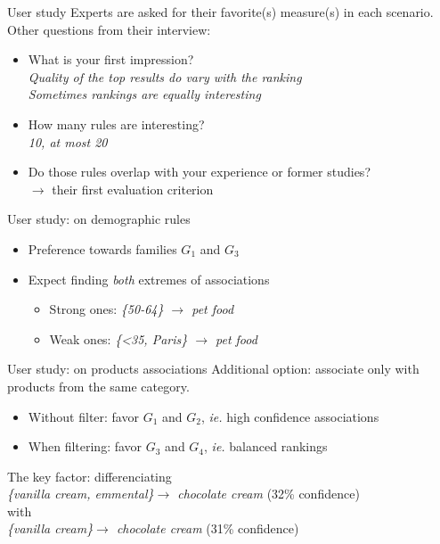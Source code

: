 \documentclass[table]{beamer}
\begin{document}
\begin{frame}[t]{User study}
  Experts are asked for their favorite(s) measure(s) in each scenario.\\
  \vspace{1cm}
  Other questions from their interview:
  \begin{itemize}
    \item What is your first impression?\\
    \pause
    {\em Quality of the top results do vary with the ranking}\\
    {\em Sometimes rankings are equally interesting}
    \pause
    \item How many rules are interesting?\\
    \pause
    {\em 10, at most 20}
    \pause
    \item Do those rules overlap with your experience or former studies?\\
    \pause
    $\rightarrow$ their first evaluation criterion
  \end{itemize}
\end{frame}


\begin{frame}{User study: on demographic rules}
  \begin{itemize}
    \item Preference towards families $G_1$ and $G_3$
    \item Expect finding {\em both} extremes of associations
    \begin{itemize}
      \item Strong ones:  {\em \{50-64\} $\rightarrow$ pet food}
      \item Weak ones:  {\em \{<35, Paris\} $\rightarrow$ pet food}
    \end{itemize}
  \end{itemize}
\end{frame}


\begin{frame}{User study: on products associations}
  Additional option: associate only with products from the same category.\\
  \pause
  \begin{itemize}
    \item Without filter: favor $G_1$ and $G_2$, {\em ie.} high confidence associations
    \item When filtering: favor $G_3$ and $G_4$, {\em ie.} balanced rankings
  \end{itemize}
  \pause
  The key factor: differenciating\\
  \textit{\{vanilla cream, emmental\}$\rightarrow$ chocolate cream} (32\% confidence)\\
  with\\
  \textit{\{vanilla cream\}$\rightarrow$ chocolate cream} (31\% confidence)
\end{frame}
\end{document}
